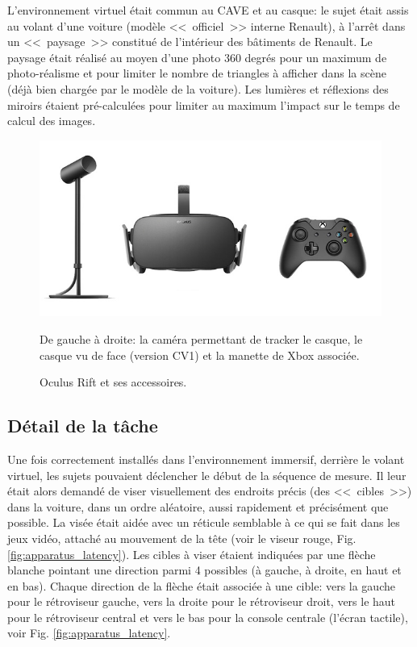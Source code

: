 	\par L'environnement virtuel était commun au CAVE et au casque: le sujet était assis au volant d'une voiture (modèle <<~officiel~>> interne Renault), à l'arrêt dans un <<~paysage~>> constitué de l'intérieur des bâtiments de Renault. Le paysage était réalisé au moyen d'une photo 360 degrés pour un maximum de photo-réalisme et pour limiter le nombre de triangles à afficher dans la scène (déjà bien chargée par le modèle de la voiture). Les lumières et réflexions des miroirs étaient pré-calculées pour limiter au maximum l'impact sur le temps de calcul des images.
	
	\begin{figure}[h]
		\centering
		\includegraphics[scale=.65]{Figures/OculusRift}
		\caption{Oculus Rift et ses accessoires.}{De gauche à droite: la caméra permettant de tracker le casque, le casque vu de face (version CV1) et la manette de Xbox associée.}
		\label{fig:oculus_rift}
	\end{figure}
	
	\subsection{Détail de la tâche}	
	\par Une fois correctement installés dans l'environnement immersif, derrière le volant virtuel, les sujets pouvaient déclencher le début de la séquence de mesure. Il leur était alors demandé de viser visuellement des endroits précis (des <<~cibles~>>) dans la voiture, dans un ordre aléatoire, aussi rapidement et précisément que possible. La visée était aidée avec un réticule semblable à ce qui se fait dans les jeux vidéo, attaché au mouvement de la tête (voir le viseur rouge, Fig. \ref{fig:apparatus_latency}). Les cibles à viser étaient indiquées par une flèche blanche pointant une direction parmi 4 possibles (à gauche, à droite, en haut et en bas). Chaque direction de la flèche était associée à une cible: vers la gauche pour le rétroviseur gauche, vers la droite pour le rétroviseur droit, vers le haut pour le rétroviseur central et vers le bas pour la console centrale (l'écran tactile), voir Fig. \ref{fig:apparatus_latency}.
	
